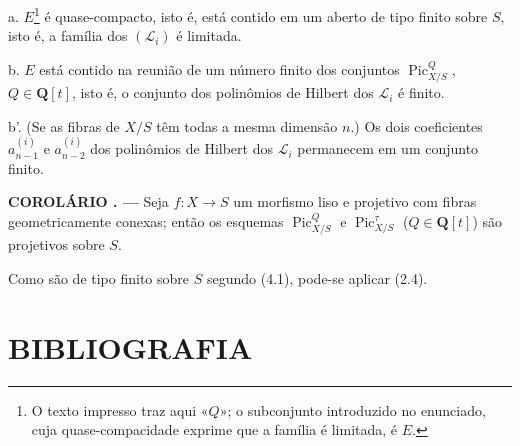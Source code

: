 \documentclass[11pt,twoside,openany]{book}
\numberwithin{equation}{section}
\newcommand{\src}[1]{%
  \phantomsection\hypertarget{src:#1}{}%
  \marginpar{\raggedleft\footnotesize\sffamily #1}%
}
\theoremstyle{plain}
\theoremstyle{definition}
\theoremstyle{remark}
\newcommand{\result}[2]{%
  \par\medskip\noindent\textbf{#1%
  \if\relax\detokenize{#2}\relax\else\space#2\fi. ---}\enspace
}
\newcommand{\FgaUnitKey}{frontmatter}
\renewcommand{\src}[1]{%
  \phantomsection\hypertarget{src:\FgaUnitKey:#1}{}%
  \marginpar{\raggedleft\footnotesize\sffamily #1}%
}
\begin{document}
\noindent a. $E$\footnote{O texto impresso traz aqui «$Q$»; o subconjunto
introduzido no enunciado, cuja quase-compacidade exprime que a família é
limitada, é $E$.} é quase-compacto, isto é, está contido em um aberto de tipo
finito sobre $S$, isto é, a família dos $(\mathcal L_i)$ é limitada.

\noindent b. $E$ está contido na reunião de um número finito dos conjuntos
$\operatorname{Pic}_{X/S}^Q$, $Q\in\mathbf Q[t]$, isto é, o conjunto dos
polinômios de Hilbert dos $\mathcal L_i$ é finito.

\noindent b'. (Se as fibras de $X/S$ têm todas a mesma dimensão $n$.) Os dois
coeficientes $a_{n-1}^{(i)}$ e $a_{n-2}^{(i)}$ dos polinômios de Hilbert dos
$\mathcal L_i$ permanecem em um conjunto finito.
\src{243}
\result{COROLÁRIO}{4.2} Seja $f:X\longrightarrow S$ um morfismo liso e
projetivo com fibras geometricamente conexas; então os esquemas
$\operatorname{Pic}_{X/S}^Q$ e $\operatorname{Pic}_{X/S}^\tau$
($Q\in\mathbf Q[t]$) são projetivos sobre $S$.

Como são de tipo finito sobre $S$ segundo (4.1), pode-se aplicar (2.4).

\section*{BIBLIOGRAFIA}
\end{document}
